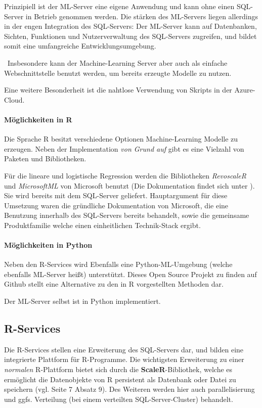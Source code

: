 Prinzipiell ist der ML-Server eine eigene Anwendung und kann ohne einen SQL-Server in Betrieb genommen werden. Die stärken des ML-Servers liegen allerdings in der engen Integration des SQL-Servers: Der ML-Server kann auf Datenbanken, Sichten, Funktionen und Nutzerverwaltung des SQL-Servers zugreifen, und bildet somit eine umfangreiche Entwicklungsumgebung.

~\newline Insbesondere kann der Machine-Learning Server aber auch als einfache Webschnittstelle benutzt werden, um bereits erzeugte Modelle zu nutzen.

Eine weitere Besonderheit ist die nahtlose Verwendung von Skripts in der Azure-Cloud. 
\paragraph{Möglichkeiten in  R}
Die Sprache R besitzt verschiedene Optionen Machine-Learning Modelle zu erzeugen. Neben der Implementation \textit{von Grund auf} gibt es eine Vielzahl von Paketen und Bibliotheken. 

Für die lineare und logistische Regression werden die Bibliotheken \textit{RevoscaleR} und \textit{MicrosoftML} von Microsoft benutzt (Die Dokumentation findet sich unter \cite{RevoscaleR}). Sie wird bereits mit dem SQL-Server geliefert. Hauptargument für diese Umsetzung waren die gründliche Dokumentation von Microsoft, die eine Benutzung innerhalb des SQL-Servers bereits behandelt, sowie die gemeinsame Produktfamilie welche einen einheitlichen Technik-Stack ergibt. 
\paragraph{Möglichkeiten in Python}
Neben den R-Services wird Ebenfalls eine Python-ML-Umgebung (welche ebenfalls ML-Server heißt) unterstützt. Dieses Open Source Projekt zu finden auf Github \cite{GithubMLServer} stellt eine Alternative zu den in R vorgestellten Methoden dar. 

Der ML-Server selbst ist in Python implementiert.

\subsection{R-Services}
Die R-Services stellen eine Erweiterung des SQL-Servers dar, und bilden eine integrierte Plattform für R-Programme. Die wichtigsten Erweiterung zu einer \textit{normalen} R-Plattform bietet sich durch die \textbf{ScaleR}-Bibliothek, welche es ermöglicht die Datenobjekte von R persistent als Datenbank oder Datei zu speichern (vgl. \cite{SQLData} Seite 7 Absatz 9). Des Weiteren werden hier auch parallelisierung und ggfs. Verteilung (bei einem verteilten SQL-Server-Cluster) behandelt.

